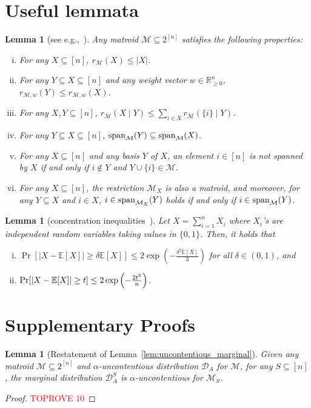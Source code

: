 \documentclass[11pt]{article}
\newcommand{\D}{\mathcal D}
\def \E {\mathbb{E}}
\newcommand{\M}{{\mathcal M}}
\def \P {\textnormal{Pr}}
\newcommand{\spa}{\textnormal{span}}
\newcommand{\R}{{\mathbb R}}
\newtheorem{lemma}[theorem]{Lemma}
\begin{document}
\appendix

\section{Useful lemmata}\label{sec:lemmata}
\begin{lemma}[see e.g.,~\cite{welsh2010matroid}]\label{lem:matroid_properties}
Any matroid $\M\subseteq 2^{[n]}$ satisfies the following properties:
\begin{enumerate}[i.]
    \item\label{fact:rank_bounded} For any $X\subseteq[n]$, $r_{\M}(X)\le|X|$.
    \item\label{fact:rank_monotone} For any $Y\subseteq X\subseteq[n]$ and any weight vector $w\in\R_{\ge0}^n$, $r_{\M,w}(Y)\le r_{\M,w}(X)$.
    \item\label{fact:rank_marginal_subadditive} For any $X,Y\subseteq [n]$, $r_{\M}(X\mid Y)\le\sum_{i\in X} r_{\M}(\{i\}\mid Y)$.
    \item\label{fact:span_monotone} For any $Y\subseteq X\subseteq[n]$, $\spa_{\M}(Y)\subseteq \spa_{\M}(X)$.
    \item\label{fact:span_of_basis} For any $X\subseteq[n]$ and any basis $Y$ of $X$, an element $i\in[n]$ is not spanned by $X$ if and only if $i\notin Y$ and $Y\cup\{i\}\in\M$.
    \item\label{fact:matroid_restriction} For any $X\subseteq [n]$, the restriction $\M_{X}$ is also a matroid, and moreover, for any $Y\subseteq X$ and $i\in X$, $i\in\spa_{\M_X}(Y)$ holds if and only if $i\in\spa_{\M}(Y)$.
\end{enumerate}
\end{lemma}

\begin{lemma}[concentration inequalities~\citep{chernoff1952measure,hoeffding1994probability}]\label{lem:concentration}
Let $X=\sum_{i=1}^n X_i$ where $X_i$'s are independent random variables taking values in $\{0,1\}$. Then, it holds that
\begin{enumerate}[i.]
    \item\label{chernoff} $\Pr[|X-\E[X]|\ge \delta \E[X]]\le 2\exp\left(-\frac{\delta^2 \E[X]}{3}\right)$ for all $\delta\in (0,1)$, and
    \item\label{hoeffding} $\P[|X-\E[X]|\ge t]\le 2\exp\left(-\frac{2t^2}{n}\right)$.
\end{enumerate}
\end{lemma}

\section{Supplementary Proofs}\label{sec:supplementary_proofs}
\begin{lemma}[Restatement of Lemma~\ref{lem:uncontentious_marginal}]
Given any matroid $\M\subseteq 2^{[n]}$ and $\alpha$-uncontentious distribution $\D_A$ for $\M$, for any $S\subseteq [n]$, the marginal distribution $\D_A^{S}$ is $\alpha$-uncontentious for $\M_{S}$.
\end{lemma}
\begin{proof}\textcolor{red}{TOPROVE 10}\end{proof}
\end{document}
